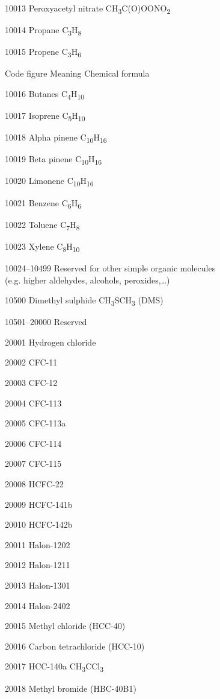 10013 Peroxyacetyl nitrate CH\textsubscript{3}C(O)OONO\textsubscript{2}

10014 Propane C\textsubscript{3}H\textsubscript{8}

10015 Propene C\textsubscript{3}H\textsubscript{6}

Code figure Meaning Chemical formula

10016 Butanes C\textsubscript{4}H\textsubscript{10}

10017 Isoprene C\textsubscript{5}H\textsubscript{10}

10018 Alpha pinene C\textsubscript{10}H\textsubscript{16}

10019 Beta pinene C\textsubscript{10}H\textsubscript{16}

10020 Limonene C\textsubscript{10}H\textsubscript{16}

10021 Benzene C\textsubscript{6}H\textsubscript{6}

10022 Toluene C\textsubscript{7}H\textsubscript{8}

10023 Xylene C\textsubscript{8}H\textsubscript{10}

10024--10499 Reserved for other simple organic molecules\\
(e.g. higher aldehydes, alcohols, peroxides,\ldots)

10500 Dimethyl sulphide CH\textsubscript{3}SCH\textsubscript{3} (DMS)

10501--20000 Reserved

20001 Hydrogen chloride

20002 CFC-11

20003 CFC-12

20004 CFC-113

20005 CFC-113a

20006 CFC-114

20007 CFC-115

20008 HCFC-22

20009 HCFC-141b

20010 HCFC-142b

20011 Halon-1202

20012 Halon-1211

20013 Halon-1301

20014 Halon-2402

20015 Methyl chloride (HCC-40)

20016 Carbon tetrachloride (HCC-10)

20017 HCC-140a CH\textsubscript{3}CCl\textsubscript{3}

20018 Methyl bromide (HBC-40B1)

